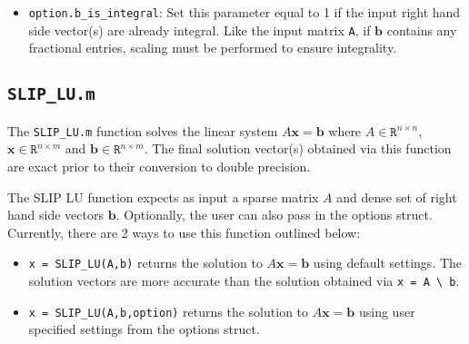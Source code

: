 \documentclass[12pt]{article}
\theoremstyle{definition}
\begin{document}
\begin{itemize}

\item \verb|option.b_is_integral|: Set this parameter equal to 1 if the input
right hand side vector(s) are already integral. Like the input matrix \verb|A|,
if $\mathbf{b}$ contains any fractional entries, scaling must be performed to
ensure integrality.

\end{itemize}

\cprotect\subsection{\verb|SLIP_LU.m|}
\label{s:Use:MATLAB:factor}

The \verb|SLIP_LU.m| function solves the linear system $A \mathbf{x} =
\mathbf{b}$ where $A \in \mathtt{R}^{n \times n}$, $\mathbf{x} \in
\mathtt{R}^{n \times m}$ and $\mathbf{b} \in \mathtt{R}^{n \times m}$. The
final solution vector(s) obtained via this function are exact prior to their
conversion to double precision.

The SLIP LU function expects as input a sparse matrix $A$ and dense set of
right hand side vectors $\mathbf{b}$. Optionally, the user can also pass in the
options struct. Currently, there are 2 ways to use this function outlined
below:

\begin{itemize}

\item \verb|x = SLIP_LU(A,b)| returns the solution to $A \mathbf{x} =
\mathbf{b}$ using default settings. The solution vectors are more accurate than
the solution obtained via \verb|x = A \ b|.

\item \verb|x = SLIP_LU(A,b,option)| returns the solution to $A \mathbf{x} =
\mathbf{b}$ using user specified settings from the options struct.

\end{itemize}


\newpage


\end{document}
